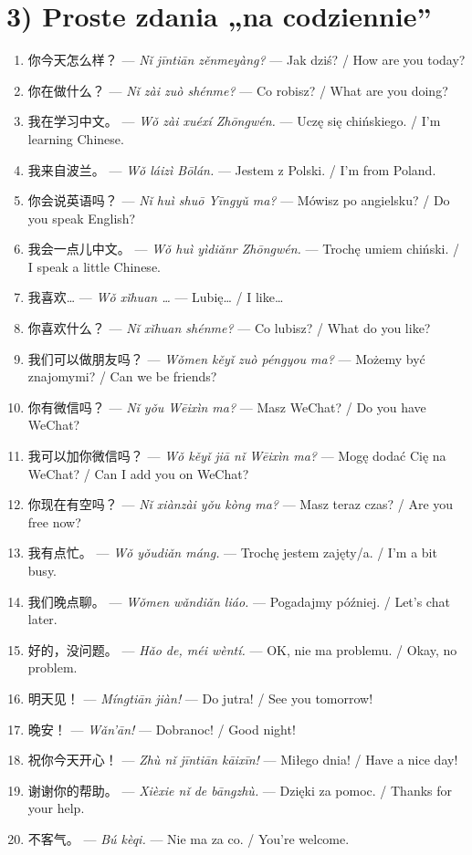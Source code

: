 \documentclass[11pt]{article}
\begin{document}
	\section*{3) Proste zdania „na codziennie”}
	\begin{enumerate}[label=\arabic*., leftmargin=*, itemsep=4pt]
		\item 你今天怎么样？ — \textit{Nǐ jīntiān zěnmeyàng?} — Jak dziś? / How are you today?
		\item 你在做什么？ — \textit{Nǐ zài zuò shénme?} — Co robisz? / What are you doing?
		\item 我在学习中文。 — \textit{Wǒ zài xuéxí Zhōngwén.} — Uczę się chińskiego. / I’m learning Chinese.
		\item 我来自波兰。 — \textit{Wǒ láizì Bōlán.} — Jestem z Polski. / I’m from Poland.
		\item 你会说英语吗？ — \textit{Nǐ huì shuō Yīngyǔ ma?} — Mówisz po angielsku? / Do you speak English?
		\item 我会一点儿中文。 — \textit{Wǒ huì yìdiǎnr Zhōngwén.} — Trochę umiem chiński. / I speak a little Chinese.
		\item 我喜欢… — \textit{Wǒ xǐhuan …} — Lubię… / I like…
		\item 你喜欢什么？ — \textit{Nǐ xǐhuan shénme?} — Co lubisz? / What do you like?
		\item 我们可以做朋友吗？ — \textit{Wǒmen kěyǐ zuò péngyou ma?} — Możemy być znajomymi? / Can we be friends?
		\item 你有微信吗？ — \textit{Nǐ yǒu Wēixìn ma?} — Masz WeChat? / Do you have WeChat?
		\item 我可以加你微信吗？ — \textit{Wǒ kěyǐ jiā nǐ Wēixìn ma?} — Mogę dodać Cię na WeChat? / Can I add you on WeChat?
		\item 你现在有空吗？ — \textit{Nǐ xiànzài yǒu kòng ma?} — Masz teraz czas? / Are you free now?
		\item 我有点忙。 — \textit{Wǒ yǒudiǎn máng.} — Trochę jestem zajęty/a. / I’m a bit busy.
		\item 我们晚点聊。 — \textit{Wǒmen wǎndiǎn liáo.} — Pogadajmy później. / Let’s chat later.
		\item 好的，没问题。 — \textit{Hǎo de, méi wèntí.} — OK, nie ma problemu. / Okay, no problem.
		\item 明天见！ — \textit{Míngtiān jiàn!} — Do jutra! / See you tomorrow!
		\item 晚安！ — \textit{Wǎn’ān!} — Dobranoc! / Good night!
		\item 祝你今天开心！ — \textit{Zhù nǐ jīntiān kāixīn!} — Miłego dnia! / Have a nice day!
		\item 谢谢你的帮助。 — \textit{Xièxie nǐ de bāngzhù.} — Dzięki za pomoc. / Thanks for your help.
		\item 不客气。 — \textit{Bú kèqi.} — Nie ma za co. / You’re welcome.
	\end{enumerate}
	
\end{document}
